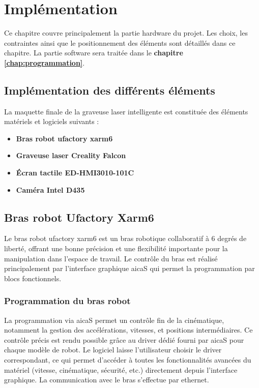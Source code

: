 \chapter{Implémentation}
\label{chap:implémentation}

Ce chapitre couvre principalement la partie \gls{hardware} du projet. Les choix, les contraintes ainsi que le positionnement des éléments sont détaillés dans ce chapitre. La partie \gls{software} sera traitée dans le \textbf{chapitre \ref{chap:programmation}}.

\section{Implémentation des différents éléments}

La maquette finale de la graveuse laser intelligente est constituée des éléments matériels et logiciels suivants :

\begin{itemize}
    \item \textbf{Bras robot \gls{ufactory} \gls{xarm6}}
    \item \textbf{Graveuse laser Creality Falcon}
    \item \textbf{Écran tactile \gls{ED-HMI3010-101C}}
    \item \textbf{Caméra Intel D435}
\end{itemize}

\section{Bras robot Ufactory Xarm6}

Le bras robot \gls{ufactory} \gls{xarm6} est un bras robotique collaboratif à 6 degrés de liberté, offrant une bonne précision et une flexibilité importante pour la manipulation dans l'espace de travail. Le contrôle du bras est réalisé principalement par l’interface graphique \gls{aicaS} qui permet la programmation par blocs fonctionnels.

\subsection{Programmation du bras robot}
La programmation via \gls{aicaS} permet un contrôle fin de la cinématique, notamment la gestion des accélérations, vitesses, et positions intermédiaires. Ce contrôle précis est rendu possible grâce au driver dédié fourni par \gls{aicaS} pour chaque modèle de robot. Le logiciel laisse l'utilisateur choisir le driver correspondant, ce qui permet d’accéder à toutes les fonctionnalités avancées du matériel (vitesse, cinématique, sécurité, etc.) directement depuis l’interface graphique. La communication avec le bras s’effectue par ethernet.

